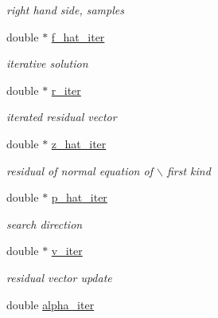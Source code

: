 \begin{CompactItemize}
\begin{CompactList}\small\item\em right hand side, samples \item\end{CompactList}\item 
\hypertarget{structinfct__plan_o5}{
double $\ast$ \hyperlink{structinfct__plan_o5}{f\_\-hat\_\-iter}}
\label{structinfct__plan_o5}

\begin{CompactList}\small\item\em iterative solution \item\end{CompactList}\item 
\hypertarget{structinfct__plan_o6}{
double $\ast$ \hyperlink{structinfct__plan_o6}{r\_\-iter}}
\label{structinfct__plan_o6}

\begin{CompactList}\small\item\em iterated residual vector \item\end{CompactList}\item 
\hypertarget{structinfct__plan_o7}{
double $\ast$ \hyperlink{structinfct__plan_o7}{z\_\-hat\_\-iter}}
\label{structinfct__plan_o7}

\begin{CompactList}\small\item\em residual of normal equation of $\backslash$ first kind \item\end{CompactList}\item 
\hypertarget{structinfct__plan_o8}{
double $\ast$ \hyperlink{structinfct__plan_o8}{p\_\-hat\_\-iter}}
\label{structinfct__plan_o8}

\begin{CompactList}\small\item\em search direction \item\end{CompactList}\item 
\hypertarget{structinfct__plan_o9}{
double $\ast$ \hyperlink{structinfct__plan_o9}{v\_\-iter}}
\label{structinfct__plan_o9}

\begin{CompactList}\small\item\em residual vector update \item\end{CompactList}\item 
\hypertarget{structinfct__plan_o10}{
double \hyperlink{structinfct__plan_o10}{alpha\_\-iter}}
\label{structinfct__plan_o10}


\end{CompactItemize}
